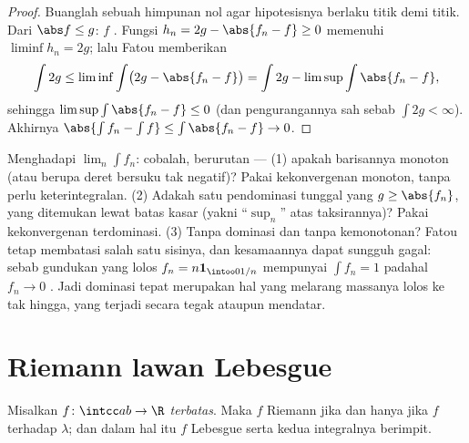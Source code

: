 \begin{proof}
Buanglah sebuah himpunan nol agar hipotesisnya berlaku titik demi titik. Dari $\abs f
\leq g$: $f$ . Fungsi $h_n = 2g - \abs{f_n
- f} \geq 0$ memenuhi $\liminf h_n = 2g$; lalu Fatou memberikan
\[
\int 2g \leq \liminf\int\bigl(2g - \abs{f_n - f}\bigr)
= \int 2g - \limsup\int\abs{f_n - f},
\]
sehingga $\limsup\int\abs{f_n - f} \leq 0$ (dan pengurangannya sah sebab
$\int 2g < \infty$). Akhirnya $\abs{\int f_n - \int f} \leq
\int\abs{f_n - f} \to 0$.
\end{proof}

\begin{method}\label{met:b3:lebesgue:convergence}
Menghadapi $\lim_n\int f_n$: cobalah, berurutan --- (1) apakah
barisannya monoton (atau berupa deret bersuku tak negatif)? Pakai kekonvergenan monoton, tanpa perlu
keterintegralan. (2) Adakah satu pendominasi tunggal yang 
$g \geq \abs{f_n}$, yang ditemukan lewat batas kasar
(yakni ``$\sup_n$'' atas taksirannya)? Pakai kekonvergenan terdominasi. (3) Tanpa dominasi dan tanpa
kemonotonan? Fatou tetap membatasi salah satu sisinya, dan kesamaannya dapat
sungguh gagal: sebab gundukan yang lolos $f_n = n\mathbf
1_{\intoo0{1/n}}$ mempunyai $\int f_n = 1$ padahal $f_n \to 0$ .
Jadi dominasi tepat merupakan hal yang melarang massanya lolos ke
tak hingga, yang terjadi secara tegak ataupun mendatar.
\end{method}

\section{Riemann lawan Lebesgue}

\begin{theorem}
\label{thm:b3:lebesgue:riemann}
Misalkan $f \colon \intcc ab \to \R$ \emph{terbatas}. Maka $f$
 Riemann jika dan hanya jika $f$  
terhadap $\lambda$; dan dalam hal itu $f$  Lebesgue serta kedua
integralnya berimpit.
\end{theorem}

